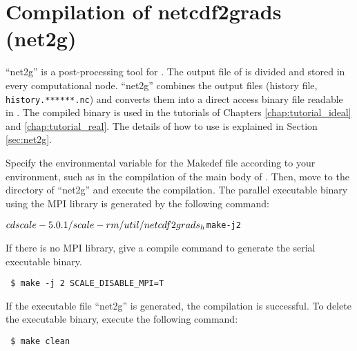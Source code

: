 \section{Compilation of netcdf2grads (net2g)} \label{sec:compile_net2g}

``net2g'' is a post-processing tool for \scalerm.
The output file of \scalerm is divided and stored in every computational node.
``net2g'' combines the output files (history file, \verb|history.******.nc|)
and converts them into a direct access binary file readable in \grads.
The compiled binary is used in the tutorials of Chapters \ref{chap:tutorial_ideal} and \ref{chap:tutorial_real}. The details of how to use is explained in Section \ref{sec:net2g}.

Specify the environmental variable for the Makedef file according to your environment,
such as in the compilation of the main body of \scalelib.
Then, move to the directory of ``net2g'' and execute the compilation. The parallel executable binary using the MPI library is generated by the following command:
\begin{alltt}
 $ cd scale-{\version}/scale-rm/util/netcdf2grads_h
 $ make -j 2
\end{alltt}
If there is no MPI library,
give a compile command to generate the serial executable binary.
\begin{verbatim}
 $ make -j 2 SCALE_DISABLE_MPI=T
\end{verbatim}
If the executable file ``net2g'' is generated, the compilation is successful.
To delete the executable binary, execute the following command:
\begin{verbatim}
 $ make clean
\end{verbatim}
